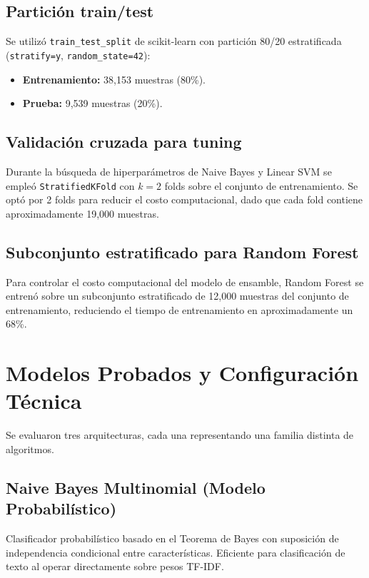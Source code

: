 ﻿\documentclass[12pt,a4paper]{article}
\begin{document}
\subsection{Partición train/test}
Se utilizó \texttt{train\_test\_split} de scikit-learn con partición
80/20 estratificada (\texttt{stratify=y}, \texttt{random\_state=42}):
\begin{itemize}
  \item \textbf{Entrenamiento:} 38,153 muestras (80\%).
  \item \textbf{Prueba:} 9,539 muestras (20\%).
\end{itemize}

\subsection{Validación cruzada para tuning}
Durante la búsqueda de hiperparámetros de Naive Bayes y Linear SVM se
empleó \texttt{StratifiedKFold} con $k=2$ folds sobre el conjunto de
entrenamiento. Se optó por 2 folds para reducir el costo computacional,
dado que cada fold contiene aproximadamente 19,000 muestras.

\subsection{Subconjunto estratificado para Random Forest}
Para controlar el costo computacional del modelo de ensamble, Random Forest
se entrenó sobre un subconjunto estratificado de 12,000 muestras del
conjunto de entrenamiento, reduciendo el tiempo de entrenamiento en
aproximadamente un 68\%.

\section{Modelos Probados y Configuración Técnica}

Se evaluaron tres arquitecturas, cada una representando una familia
distinta de algoritmos.

\subsection{Naive Bayes Multinomial (Modelo Probabilístico)}
Clasificador probabilístico basado en el Teorema de Bayes con suposición
de independencia condicional entre características. Eficiente para
clasificación de texto al operar directamente sobre pesos TF-IDF.
\end{document}
